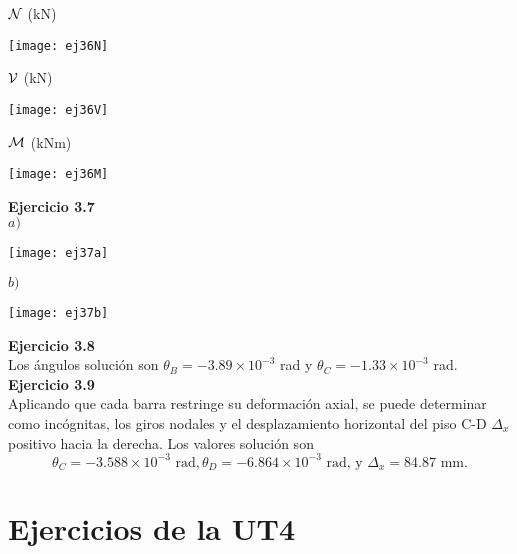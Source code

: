 ${\mathcal N}$ (kN)

\begin{center}
	\texttt{[image: ej36N]}
\end{center}

${\mathcal V}$ (kN)

\begin{center}
	\texttt{[image: ej36V]}
\end{center}

${\mathcal M}$ (kNm)

\begin{center}
	\texttt{[image: ej36M]}
\end{center}


\textbf{Ejercicio 3.7}\\

$a)$

\begin{center}
	\texttt{[image: ej37a]}
\end{center}

$b)$

\begin{center}
	\texttt{[image: ej37b]}
\end{center}

\textbf{Ejercicio 3.8}\\

Los ángulos solución son $\theta_B = -3.89 \times 10^{-3}$ rad y $\theta_C=-1.33   \times 10^{-3}$  rad.\\



\vspace{5mm}
\textbf{Ejercicio 3.9}\\

Aplicando que cada barra restringe su deformación axial, se puede determinar como incógnitas, los giros nodales y el desplazamiento horizontal del piso C-D $\Delta_x$ positivo hacia la derecha. Los valores solución son 
$$
\theta_C = -3.588 \times 10^{-3}  \text{ rad}, \theta_D = -6.864 \times 10^{-3}  \text{ rad,  y } \Delta_x = 84.87 \text{ mm}.
$$




\section{Ejercicios de la UT4}

